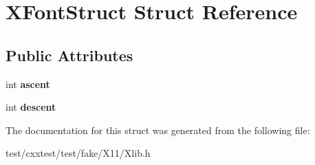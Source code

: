 \hypertarget{structXFontStruct}{\section{X\-Font\-Struct Struct Reference}
\label{structXFontStruct}
}
\subsection*{Public Attributes}
\begin{DoxyCompactItemize}
\item 
\hypertarget{structXFontStruct_a21583ea14891095cc034c2a007456f75}{int {\bfseries ascent}}\label{structXFontStruct_a21583ea14891095cc034c2a007456f75}

\item 
\hypertarget{structXFontStruct_a2a56d6077f65e894ed9b94ea0779f4cb}{int {\bfseries descent}}\label{structXFontStruct_a2a56d6077f65e894ed9b94ea0779f4cb}

\end{DoxyCompactItemize}


The documentation for this struct was generated from the following file\-:\begin{DoxyCompactItemize}
\item 
test/cxxtest/test/fake/\-X11/Xlib.\-h\end{DoxyCompactItemize}
